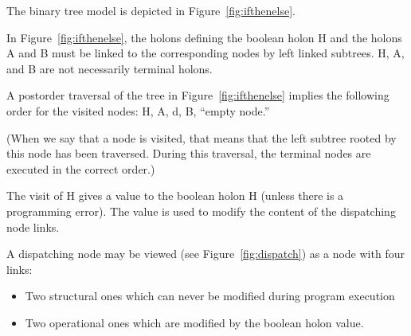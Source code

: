 \documentclass[openany,nobib]{tufte-book}
\begin{document}
\medskip
\begin{marginfigure}[1cm]
\caption{Binary tree model for an \mbox{if-then-else} statement.}
\label{fig:ifthenelse}
\end{marginfigure}

\noindent The binary tree model is depicted in Figure~\ref{fig:ifthenelse}.

In Figure~\ref{fig:ifthenelse}, the holons defining the boolean holon H and the
holons A and B must be linked to the corresponding nodes by left linked
subtrees. H, A, and B are not necessarily terminal holons.

A postorder traversal of the tree in Figure~\ref{fig:ifthenelse} implies the
following order for the visited nodes: H, A, d, B, ``empty node.''

(When we say that a node is visited, that means that the left subtree rooted by
this node has been traversed. During this traversal, the terminal nodes are
executed in the correct order.)

The visit of H gives a value to the boolean holon H (unless there is a
programming error). The value is used to modify the content of the dispatching
node links.

A dispatching node may be viewed (see Figure~\ref{fig:dispatch}) as a node with
four links:
\begin{itemize}
    \item Two structural ones which can never be modified during program
execution
    \item Two operational ones which are modified by the boolean holon value.
\end{itemize}
\end{document}
